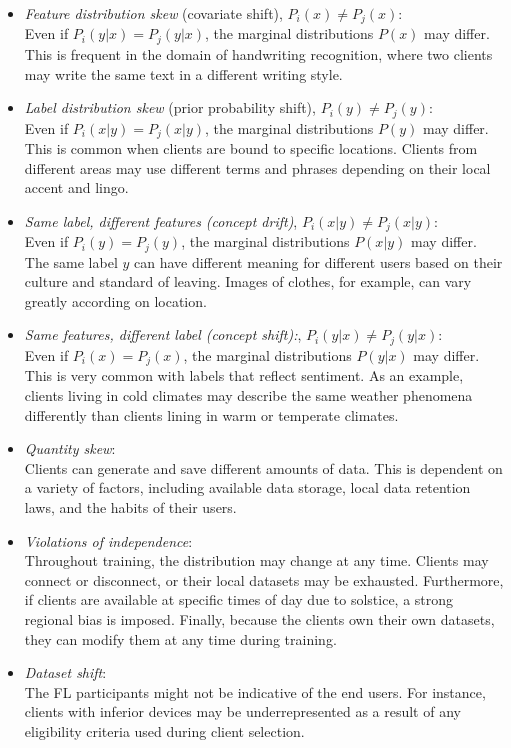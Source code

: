 \begin{itemize}
  \item \emph{Feature distribution skew} (covariate shift), \(P_i(x) \neq P_j(x)\):\\
  Even if \(P_i(y|x) = P_j(y|x)\), the marginal distributions \(P(x)\) may differ. This is frequent in the domain of handwriting recognition, where two clients may write the same text in a different writing style.
  
  \item \emph{Label distribution skew} (prior probability shift), \(P_i(y) \neq P_j(y)\):\\
  Even if \(P_i(x|y) = P_j(x|y)\), the marginal distributions \(P(y)\) may differ. This is common when clients are bound to specific locations. Clients from different areas may use different terms and phrases depending on their local accent and lingo.
  
  \item \emph{Same label, different features (concept drift)}, \(P_i(x|y) \neq P_j(x|y)\):\\
  Even if \(P_i(y) = P_j(y)\), the marginal distributions \(P(x|y)\) may differ. The same label \(y\) can have different meaning for different users based on their culture and standard of leaving. Images of clothes, for example, can vary greatly according on location.
  
  \item \emph{Same features, different label (concept shift):}, \(P_i(y|x) \neq P_j(y|x)\):\\
  Even if \(P_i(x) = P_j(x)\), the marginal distributions \(P(y|x)\) may differ. This is very common with labels that reflect sentiment. As an example, clients living in cold climates may describe the same weather phenomena differently than clients lining in warm or temperate climates.
  
  \item \emph{Quantity skew}:\\
  Clients can generate and save different amounts of data. This is dependent on a variety of factors, including available data storage, local data retention laws, and the habits of their users.
  
  \item \emph{Violations of independence}:\\
  Throughout training, the distribution may change at any time. Clients may connect or disconnect, or their local datasets may be exhausted. Furthermore, if clients are available at specific times of day due to solstice, a strong regional bias is imposed. Finally, because the clients own their own datasets, they can modify them at any time during training.
  
  \item \emph{Dataset shift}:\\
  The FL participants might not be indicative of the end users. For instance, clients with inferior devices may be underrepresented as a result of any eligibility criteria used during client selection.
\end{itemize}

